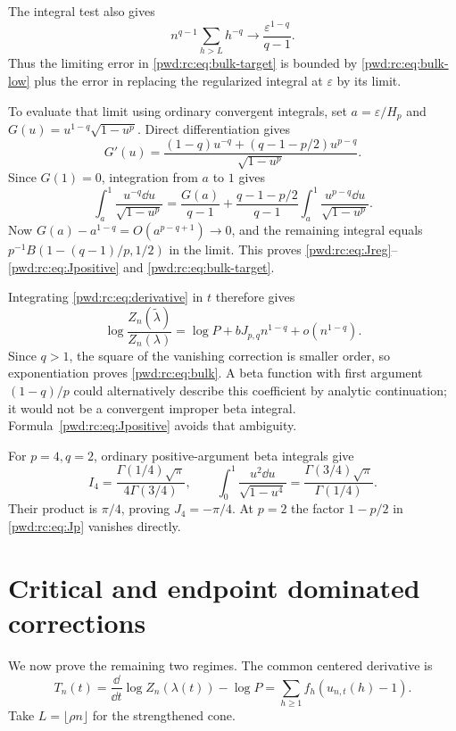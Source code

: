 \documentclass[11pt,letterpaper]{article}
\numberwithin{equation}{section}
\theoremstyle{remark}\newtheorem{remark}[theorem]{Remark}
\begin{document}
The integral test also gives
\[
 n^{q-1}\sum_{h>L}h^{-q}\longrightarrow\frac{\varepsilon^{1-q}}{q-1}.
\]
Thus the limiting error in \eqref{pwd:rc:eq:bulk-target} is bounded by \eqref{pwd:rc:eq:bulk-low} plus the error in replacing the regularized integral at $\varepsilon$ by its limit.

To evaluate that limit using ordinary convergent integrals, set $a=\varepsilon/H_p$ and $G(u)=u^{1-q}\sqrt{1-u^p}$. Direct differentiation gives
\[
 G'(u)=\frac{(1-q)u^{-q}+(q-1-p/2)u^{p-q}}{\sqrt{1-u^p}}.
\]
Since $G(1)=0$, integration from $a$ to $1$ gives
\[
 \int_a^1\frac{u^{-q}\dd u}{\sqrt{1-u^p}}
 =\frac{G(a)}{q-1}+\frac{q-1-p/2}{q-1}
 \int_a^1\frac{u^{p-q}\dd u}{\sqrt{1-u^p}}.
\]
Now $G(a)-a^{1-q}=O(a^{p-q+1})\to0$, and the remaining integral equals $p^{-1}B(1-(q-1)/p,1/2)$ in the limit. This proves \eqref{pwd:rc:eq:Jreg}--\eqref{pwd:rc:eq:Jpositive} and \eqref{pwd:rc:eq:bulk-target}.

Integrating \eqref{pwd:rc:eq:derivative} in $t$ therefore gives
\[
 \log\frac{Z_n(\widetilde\lambda)}{Z_n(\lambda)}
 =\log P+bJ_{p,q}n^{1-q}+o(n^{1-q}).
\]
Since $q>1$, the square of the vanishing correction is smaller order, so exponentiation proves \eqref{pwd:rc:eq:bulk}. A beta function with first argument $(1-q)/p$ could alternatively describe this coefficient by analytic continuation; it would not be a convergent improper beta integral. Formula~\eqref{pwd:rc:eq:Jpositive} avoids that ambiguity.

For $p=4,q=2$, ordinary positive-argument beta integrals give
\[
 I_4=\frac{\Gamma(1/4)\sqrt\pi}{4\Gamma(3/4)},\qquad
 \int_0^1\frac{u^2\dd u}{\sqrt{1-u^4}}
 =\frac{\Gamma(3/4)\sqrt\pi}{\Gamma(1/4)}.
\]
Their product is $\pi/4$, proving $J_4=-\pi/4$. At $p=2$ the factor $1-p/2$ in \eqref{pwd:rc:eq:Jp} vanishes directly.

\section{Critical and endpoint dominated corrections}\label{pwd:rc:sec:phases}
We now prove the remaining two regimes. The common centered derivative is
\begin{equation}\label{pwd:rc:eq:centered}
 T_n(t)=\frac{\dd}{\dd t}\log Z_n(\lambda(t))-\log P
       =\sum_{h\ge1}f_h(u_{n,t}(h)-1).
\end{equation}
Take $L=\lfloor\rho n\rfloor$ for the strengthened cone.
\end{document}
